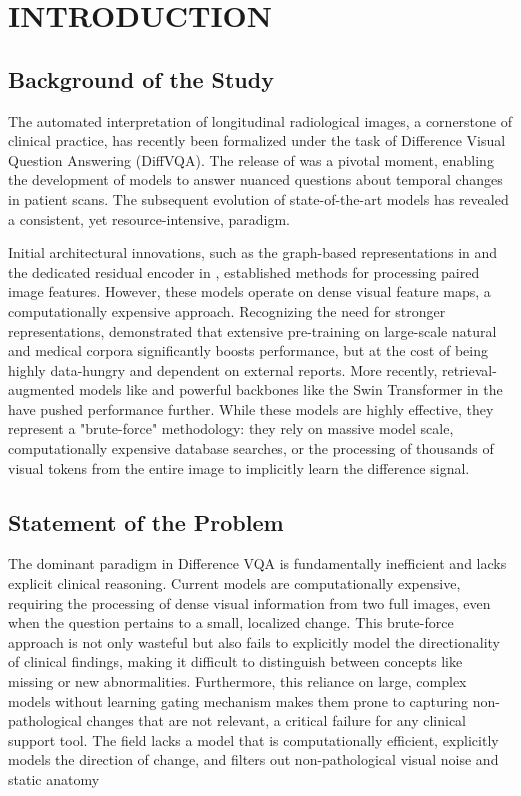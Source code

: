 \chapter{INTRODUCTION} 

\section{Background of the Study}
The automated interpretation of longitudinal radiological images, a cornerstone of clinical practice, has recently been formalized under the task of Difference Visual Question Answering (DiffVQA). The release of \cite{medical-diff-vqa} was a pivotal moment, enabling the development of models to answer nuanced questions about temporal changes in patient scans. The subsequent evolution of state-of-the-art models has revealed a consistent, yet resource-intensive, paradigm.

Initial architectural innovations, such as the graph-based representations in \cite{ekaid} and the dedicated residual encoder in \cite{real}, established methods for processing paired image features. However, these models operate on dense visual feature maps, a computationally expensive approach. Recognizing the need for stronger representations, \cite{plural} demonstrated that extensive pre-training on large-scale natural and medical corpora significantly boosts performance, but at the cost of being highly data-hungry and dependent on external reports. More recently, retrieval-augmented models like \cite{regiomix} and powerful backbones like the Swin Transformer in the \cite{encoder-decoder} have pushed performance further. While these models are highly effective, they represent a "brute-force" methodology: they rely on massive model scale, computationally expensive database searches, or the processing of thousands of visual tokens from the entire image to implicitly learn the difference signal.

\section{Statement of the Problem}
The dominant paradigm in Difference VQA is fundamentally inefficient and lacks explicit clinical reasoning. Current models are computationally expensive, requiring the processing of dense visual information from two full images, even when the question pertains to a small, localized change. This brute-force approach is not only wasteful but also fails to explicitly model the directionality of clinical findings, making it difficult to distinguish between concepts like missing or new abnormalities. Furthermore, this reliance on large, complex models without learning gating mechanism makes them prone to capturing non-pathological changes that are not relevant, a critical failure for any clinical support tool. The field lacks a model that is computationally efficient, explicitly models the direction of change, and filters out non-pathological visual noise and static anatomy

